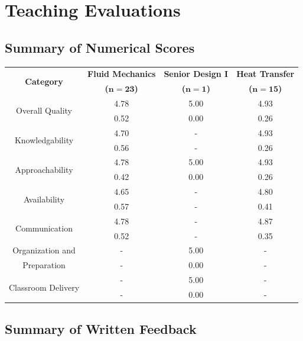 \pagestyle{plain}
\chapter[Teaching Evaluations][Teaching Evaluations]{Teaching Evaluations}

\section{Summary of Numerical Scores}

\begin{table}[h]
\begin{center}
\renewcommand{\arraystretch}{1.15}
\setlength{\tabcolsep}{0.10cm}
\begin{tabular}{|c|c|c|c|}
\hline \hline
\multirow{2}{*}{\textbf{Category}} & \textbf{Fluid Mechanics} & \textbf{Senior Design I} & \textbf{Heat Transfer} \\ 	
 &  \textbf{($\boldsymbol{n=23}$)} & \textbf{($\boldsymbol{n=1}$)} & \textbf{($\boldsymbol{n=15}$)} \\ 	
\hline
\multirow{2}{*}{Overall Quality} 	& 4.78 & 5.00 & 4.93 \\
						& 0.52 & 0.00 & 0.26 \\
\hline
\multirow{2}{*}{Knowledgability} 	& 4.70 & - & 4.93 \\
						& 0.56 & - & 0.26 \\
\hline
\multirow{2}{*}{Approachability} 	& 4.78 & 5.00 & 4.93 \\
						& 0.42 & 0.00 & 0.26 \\
\hline
\multirow{2}{*}{Availability} 		& 4.65 & - & 4.80 \\
						& 0.57 & - & 0.41 \\
\hline
\multirow{2}{*}{Communication} 	& 4.78 & - & 4.87 \\
						& 0.52 & - & 0.35 \\
\hline
\multirow{1}{*}{Organization and} 	& - & 5.00 & - \\
\multirow{1}{*}{Preparation} 		& - & 0.00 & - \\
\hline
\multirow{2}{*}{Classroom Delivery} 	& - & 5.00 & - \\
						& - & 0.00 & - \\
\hline \hline
\end{tabular} \end{center} \end{table}

\section{Summary of Written Feedback}

